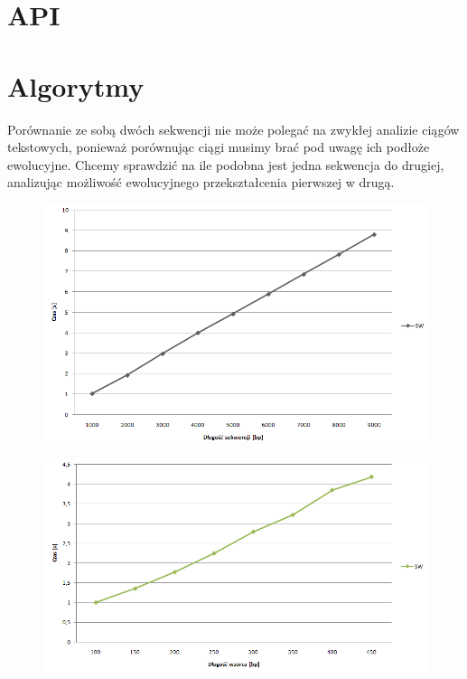 \section{API}

\section{Algorytmy}
Porównanie ze sobą dwóch sekwencji nie może polegać na zwykłej analizie ciągów tekstowych, ponieważ porównując ciągi musimy brać pod uwagę ich podłoże ewolucyjne. Chcemy sprawdzić na ile podobna jest jedna sekwencja do drugiej, analizując możliwość ewolucyjnego przekształcenia pierwszej w drugą. 

\begin{figure}[h]
	\centering
	\includegraphics[width=1\textwidth]{img/sm-sekwencja-zmienna.png}
	\caption{}
	\label{img:sm-sekwencja-zmienna}
\end{figure}

\begin{figure}[h]
	\centering
	\includegraphics[width=1\textwidth]{img/sm-wzorzec-zmienny.png}
	\caption{}
	\label{img:sm-wzorzec-zmienny}
\end{figure}

